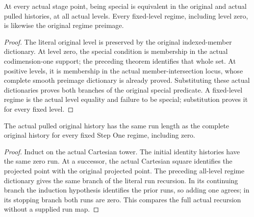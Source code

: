 \begin{theorem}
\label{hir:smooth-all-branches-original-special-regime}
\leanok
{}
At every actual stage point, being special is equivalent in the original
and actual pulled histories, at all actual levels.  Every fixed-level
regime, including level zero, is likewise the original regime preimage.
\end{theorem}
\begin{proof}
The literal original level is preserved by the original indexed-member
dictionary.  At level zero, the special condition is membership in the
actual codimension-one support; the preceding theorem identifies that whole
set.  At positive levels, it is membership in the actual member-intersection
locus, whose complete smooth preimage dictionary is already proved.
Substituting these actual dictionaries proves both branches of the original
special predicate.  A fixed-level regime is the actual level equality and
failure to be special; substitution proves it for every fixed level.
\end{proof}

\begin{theorem}
\label{hir:smooth-all-branches-original-regime-run}
\leanok
{}
The actual pulled original history has the same run length as the complete
original history for every fixed Step One regime, including zero.
\end{theorem}
\begin{proof}
Induct on the actual Cartesian tower.  The initial identity histories have
the same zero run.  At a successor, the actual Cartesian square identifies
the projected point with the original projected point.  The preceding
all-level regime dictionary gives the same branch of the literal run
recursion.  In its continuing branch the induction hypothesis identifies
the prior runs, so adding one agrees; in its stopping branch both runs are
zero.  This compares the full actual recursion without a supplied run map.
\end{proof}

